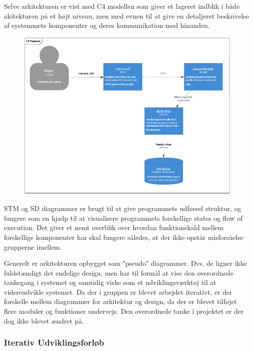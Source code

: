 Selve arkitekturen er vist med C4 modellen som giver et lageret indblik i både
akitekturen på et højt niveau, men med evnen til at give en detaljeret beskrivelse
af systemmets komponenter og deres kommunikation med hinanden.

\begin{figure}[H]
  \centering
  \includegraphics[scale=0.8]{02-Body/Images/C4TopLvlDB.PNG}
  \caption{}
  \label{fig:c4}
\end{figure}

STM og SD diagrammer er brugt til at give programmets udførsel struktur, og fungere
som en hjælp til at visualisere programmets forskellige states og flow of execution.
Det giver et nemt overblik over hvordan funktionskald mellem forskellige komponenter
har skal fungere således, at der ikke opstår misforsåelse grupperne imellem. 

Generelt er arkitekturen opbygget som "pseudo" diagrammer. Dvs. de ligner ikke fuldstændigt 
det endelige design, men har til formål at vise den overordnede tankegang i systemet og 
samtidig virke som et udviklingsværktøj til at videreudvikle systemet. Da der i gruppen 
er blevet arbejdet iterativt, er der forskelle mellem diagrammer for arkitektur og design,
da der er blevet tilføjet flere moduler og funktioner undervejs. Den overordnede tanke i 
projektet er der dog ikke blevet ændret på.

\subsubsection{Iterativ Udviklingsforløb}

